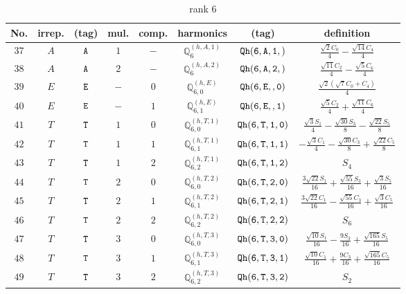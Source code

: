 \documentclass[fleqn,8pt]{jsarticle}
\begin{document}
\begin{table}[ht!]
\begin{center}
\caption{rank 6}
\renewcommand{\arraystretch}{1.3}
\begin{tabular}{cccccccc} \hline \hline
No. & irrep. & (tag) & mul. & comp. & harmonics & (tag) & definition \\ \hline
$ 37 $ & $ A $ & $ {\tt A} $ & $ 1 $ & $ - $ & $ \mathbb{Q}_{6}^{(h,A,1)} $ & $ {\tt Qh(6,A,1,)} $ & $ \frac{\sqrt{2} C_{0}}{4} - \frac{\sqrt{14} C_{4}}{4} $ \\
$ 38 $ & $ A $ & $ {\tt A} $ & $ 2 $ & $ - $ & $ \mathbb{Q}_{6}^{(h,A,2)} $ & $ {\tt Qh(6,A,2,)} $ & $ \frac{\sqrt{11} C_{2}}{4} - \frac{\sqrt{5} C_{6}}{4} $ \\
$ 39 $ & $ E $ & $ {\tt E} $ & $ - $ & $ 0 $ & $ \mathbb{Q}_{6,0}^{(h,E)} $ & $ {\tt Qh(6,E,,0)} $ & $ \frac{\sqrt{2} \left(\sqrt{7} C_{0} + C_{4}\right)}{4} $ \\
$ 40 $ & $ E $ & $ {\tt E} $ & $ - $ & $ 1 $ & $ \mathbb{Q}_{6,1}^{(h,E)} $ & $ {\tt Qh(6,E,,1)} $ & $ \frac{\sqrt{5} C_{2}}{4} + \frac{\sqrt{11} C_{6}}{4} $ \\
$ 41 $ & $ T $ & $ {\tt T} $ & $ 1 $ & $ 0 $ & $ \mathbb{Q}_{6,0}^{(h,T,1)} $ & $ {\tt Qh(6,T,1,0)} $ & $ \frac{\sqrt{3} S_{1}}{4} - \frac{\sqrt{30} S_{3}}{8} - \frac{\sqrt{22} S_{5}}{8} $ \\
$ 42 $ & $ T $ & $ {\tt T} $ & $ 1 $ & $ 1 $ & $ \mathbb{Q}_{6,1}^{(h,T,1)} $ & $ {\tt Qh(6,T,1,1)} $ & $ - \frac{\sqrt{3} C_{1}}{4} - \frac{\sqrt{30} C_{3}}{8} + \frac{\sqrt{22} C_{5}}{8} $ \\
$ 43 $ & $ T $ & $ {\tt T} $ & $ 1 $ & $ 2 $ & $ \mathbb{Q}_{6,2}^{(h,T,1)} $ & $ {\tt Qh(6,T,1,2)} $ & $ S_{4} $ \\
$ 44 $ & $ T $ & $ {\tt T} $ & $ 2 $ & $ 0 $ & $ \mathbb{Q}_{6,0}^{(h,T,2)} $ & $ {\tt Qh(6,T,2,0)} $ & $ \frac{3 \sqrt{22} S_{1}}{16} + \frac{\sqrt{55} S_{3}}{16} + \frac{\sqrt{3} S_{5}}{16} $ \\
$ 45 $ & $ T $ & $ {\tt T} $ & $ 2 $ & $ 1 $ & $ \mathbb{Q}_{6,1}^{(h,T,2)} $ & $ {\tt Qh(6,T,2,1)} $ & $ \frac{3 \sqrt{22} C_{1}}{16} - \frac{\sqrt{55} C_{3}}{16} + \frac{\sqrt{3} C_{5}}{16} $ \\
$ 46 $ & $ T $ & $ {\tt T} $ & $ 2 $ & $ 2 $ & $ \mathbb{Q}_{6,2}^{(h,T,2)} $ & $ {\tt Qh(6,T,2,2)} $ & $ S_{6} $ \\
$ 47 $ & $ T $ & $ {\tt T} $ & $ 3 $ & $ 0 $ & $ \mathbb{Q}_{6,0}^{(h,T,3)} $ & $ {\tt Qh(6,T,3,0)} $ & $ \frac{\sqrt{10} S_{1}}{16} - \frac{9 S_{3}}{16} + \frac{\sqrt{165} S_{5}}{16} $ \\
$ 48 $ & $ T $ & $ {\tt T} $ & $ 3 $ & $ 1 $ & $ \mathbb{Q}_{6,1}^{(h,T,3)} $ & $ {\tt Qh(6,T,3,1)} $ & $ \frac{\sqrt{10} C_{1}}{16} + \frac{9 C_{3}}{16} + \frac{\sqrt{165} C_{5}}{16} $ \\
$ 49 $ & $ T $ & $ {\tt T} $ & $ 3 $ & $ 2 $ & $ \mathbb{Q}_{6,2}^{(h,T,3)} $ & $ {\tt Qh(6,T,3,2)} $ & $ S_{2} $ \\
 \hline \hline
\end{tabular}
\end{center}
\end{table}
\end{document}
